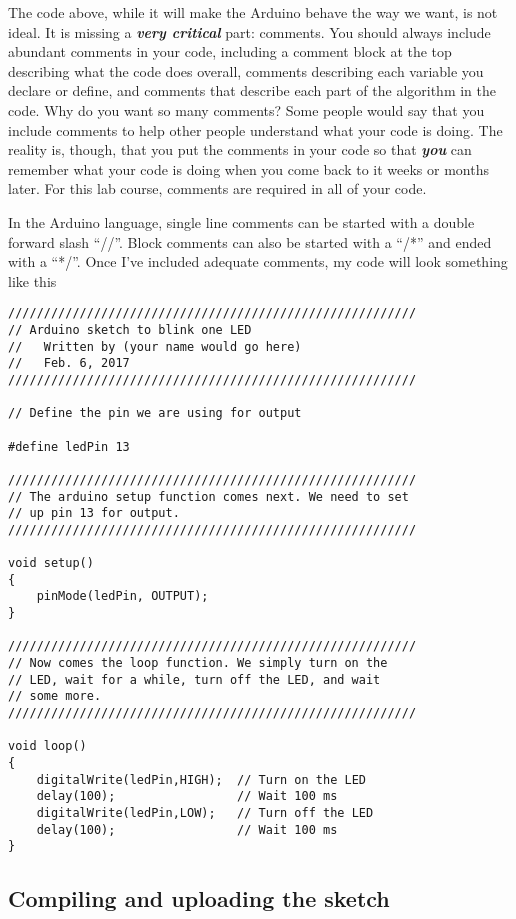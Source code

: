 The code above, while it will make the Arduino behave the way we want, is not
ideal. It is missing a \textit{\textbf{very critical}} part: comments. You 
should always include abundant comments in your code, including a comment 
block at the top describing what the code does overall, comments describing
each variable you declare or define, and comments that describe each part of
the algorithm in the code. Why do you want so many comments? Some people would
say that you include comments to help other people understand what your code
is doing. The reality is, though, that you put the comments in your code so 
that \textit{\textbf{you}} can remember what your code is doing when you 
come back to it weeks or months later. For this lab course, comments are 
required in all of your code.

In the Arduino language, single line comments can be started with a double
forward slash ``//''. Block comments can also be started with a ``/*'' and 
ended with a ``*/''.
Once I've included adequate comments, my code will look something like this
\begin{lstlisting}[language=Arduino] 
/////////////////////////////////////////////////////////
// Arduino sketch to blink one LED
//   Written by (your name would go here)
//   Feb. 6, 2017 
/////////////////////////////////////////////////////////

// Define the pin we are using for output

#define ledPin 13

/////////////////////////////////////////////////////////
// The arduino setup function comes next. We need to set
// up pin 13 for output. 
/////////////////////////////////////////////////////////

void setup() 
{
    pinMode(ledPin, OUTPUT);
}

/////////////////////////////////////////////////////////
// Now comes the loop function. We simply turn on the 
// LED, wait for a while, turn off the LED, and wait 
// some more.
/////////////////////////////////////////////////////////

void loop() 
{
    digitalWrite(ledPin,HIGH);  // Turn on the LED
    delay(100);                 // Wait 100 ms
    digitalWrite(ledPin,LOW);   // Turn off the LED
    delay(100);                 // Wait 100 ms
}
\end{lstlisting}

\subsection{Compiling and uploading the sketch}

